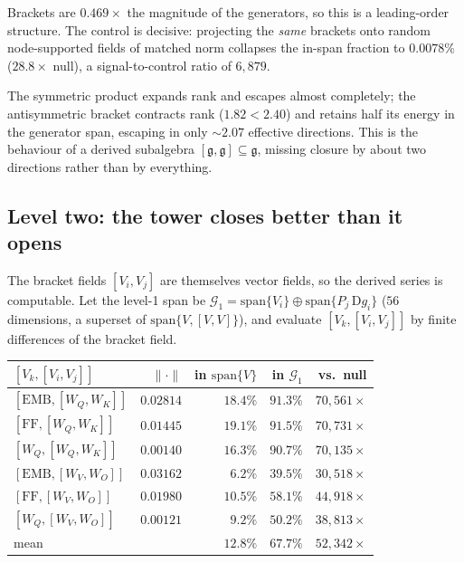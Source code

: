 Brackets are $0.469\times$ the magnitude of the generators, so this is a
leading-order structure. The control is decisive: projecting the \emph{same}
brackets onto random node-supported fields of matched norm collapses the
in-span fraction to $0.0078\%$ ($28.8\times$ null), a signal-to-control ratio
of $6{,}879$.

\begin{observation}
The symmetric product expands rank and escapes almost completely; the
antisymmetric bracket contracts rank ($1.82 < 2.40$) and retains half its
energy in the generator span, escaping in only $\sim\!2.07$ effective
directions. This is the behaviour of a derived subalgebra
$[\mathfrak{g},\mathfrak{g}]\subseteq\mathfrak{g}$, missing closure by about
two directions rather than by everything.
\end{observation}

\subsection{Level two: the tower closes better than it opens}

The bracket fields $[V_i,V_j]$ are themselves vector fields, so the derived
series is computable. Let the level-1 span be
$\mathcal{G}_1=\mathrm{span}\{V_i\}\oplus\mathrm{span}\{P_j\,\mathrm{D}g_i\}$
($56$ dimensions, a superset of $\mathrm{span}\{V,[V,V]\}$), and evaluate
$[V_k,[V_i,V_j]]$ by finite differences of the bracket field.

\begin{center}
\begin{tabular}{lrrrr}
\toprule
$[V_k,[V_i,V_j]]$ & $\|\cdot\|$ & in $\mathrm{span}\{V\}$ & in $\mathcal{G}_1$ & vs.\ null \\
\midrule
$[\mathrm{EMB},[W_Q,W_K]]$ & $0.02814$ & $18.4\%$ & $91.3\%$ & $70{,}561\times$ \\
$[\mathrm{FF},[W_Q,W_K]]$  & $0.01445$ & $19.1\%$ & $91.5\%$ & $70{,}731\times$ \\
$[W_Q,[W_Q,W_K]]$          & $0.00140$ & $16.3\%$ & $90.7\%$ & $70{,}135\times$ \\
$[\mathrm{EMB},[W_V,W_O]]$ & $0.03162$ & $6.2\%$  & $39.5\%$ & $30{,}518\times$ \\
$[\mathrm{FF},[W_V,W_O]]$  & $0.01980$ & $10.5\%$ & $58.1\%$ & $44{,}918\times$ \\
$[W_Q,[W_V,W_O]]$          & $0.00121$ & $9.2\%$  & $50.2\%$ & $38{,}813\times$ \\
\midrule
mean                       &           & $12.8\%$ & $67.7\%$ & $52{,}342\times$ \\
\bottomrule
\end{tabular}
\end{center}

